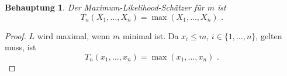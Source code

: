 \documentclass[a4paper]{scrartcl}
\newtheorem*{behaupt}{Behauptung}
\def \blattnr {7}
\begin{document}
\begin{enumerate}[label=\bfseries \blattnr.\arabic*]
\begin{enumerate}
            \begin{behaupt}
                Der Maximum-Likelihood-Schätzer für $m$ ist
                \begin{equation*}
                    T_n(X_1, \dotsc, X_n) = \max(X_1, \dots, X_n)
                    \text{ .}
                \end{equation*}
            \end{behaupt}
            \begin{proof}
                $L$ wird maximal, wenn $m$ minimal ist. Da $x_i \leq m$, $i \in
                \{1,\dotsc,n\}$, gelten muss, ist
                \begin{equation*}
                    T_n(x_1, \dotsc, x_n) = \max(x_1, \dotsc, x_n)
                    \text{ .}
                \end{equation*}
            \end{proof}


\end{enumerate}
\end{enumerate}
\end{document}
